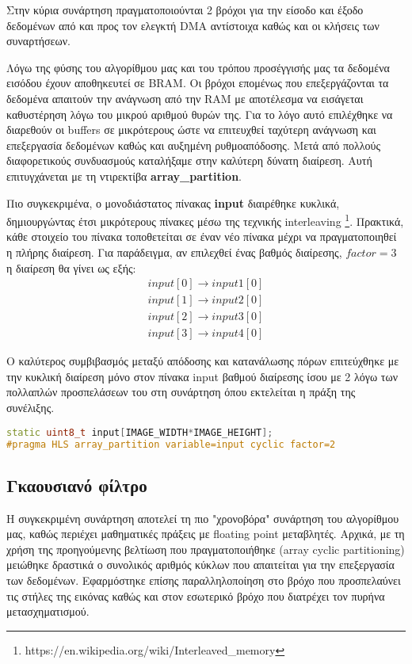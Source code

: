 Στην κύρια συνάρτηση πραγματοποιούνται 2 βρόχοι για την είσοδο και έξοδο δεδομένων από και προς τον ελεγκτή DΜΑ αντίστοιχα καθώς και οι κλήσεις των συναρτήσεων.

Λόγω της φύσης του αλγορίθμου μας και του τρόπου προσέγγισής μας τα δεδομένα εισόδου έχουν αποθηκευτεί σε BRAM. Οι βρόχοι επομένως που επεξεργάζονται τα δεδομένα απαιτούν την ανάγνωση από την RAM με αποτέλεσμα να εισάγεται καθυστέρηση λόγω του μικρού αριθμού θυρών της. Για το λόγο αυτό επιλέχθηκε να διαρεθούν οι buffers σε μικρότερους ώστε να επιτευχθεί ταχύτερη ανάγνωση και επεξεργασία δεδομένων καθώς και αυξημένη ρυθμοαπόδοσης. Μετά από πολλούς διαφορετικούς συνδυασμούς καταλήξαμε στην καλύτερη δύνατη διαίρεση. Αυτή επιτυγχάνεται με τη ντιρεκτίβα \textbf{array\_partition}.

Πιο συγκεκριμένα, ο μονοδιάστατος πίνακας \textbf{input} διαιρέθηκε κυκλικά, δημιουργώντας έτσι μικρότερους πίνακες μέσω της τεχνικής interleaving \footnote{https://en.wikipedia.org/wiki/Interleaved\_memory}. Πρακτικά, κάθε στοιχείο του πίνακα τοποθετείται σε έναν νέο πίνακα μέχρι να πραγματοποιηθεί η πλήρης διαίρεση. Για παράδειγμα, αν επιλεχθεί ένας βαθμός διαίρεσης, $factor =3$ η διαίρεση θα γίνει ως εξής:
\begin{align*}
input[0] \longrightarrow input1[0] \\
input[1] \longrightarrow input2[0] \\
input[2] \longrightarrow input3[0] \\
input[3] \longrightarrow input4[0]
\end{align*}

Ο καλύτερος συμβιβασμός μεταξύ απόδοσης και κατανάλωσης πόρων επιτεύχθηκε με την κυκλική διαίρεση μόνο στον πίνακα input βαθμού διαίρεσης ίσου με 2 λόγω των πολλαπλών προσπελάσεων του στη συνάρτηση όπου εκτελείται η πράξη της συνέλιξης.

\begin{lstlisting}[language=C++,belowskip=-0.3\baselineskip]
static uint8_t input[IMAGE_WIDTH*IMAGE_HEIGHT];
#pragma HLS array_partition variable=input cyclic factor=2
\end{lstlisting}

\subsection{Γκαουσιανό φίλτρο}

Η συγκεκριμένη συνάρτηση αποτελεί τη πιο "χρονοβόρα" συνάρτηση του αλγορίθμου μας, καθώς περιέχει μαθηματικές πράξεις με floating point μεταβλητές. Αρχικά, με τη χρήση της προηγούμενης βελτίωση που πραγματοποιήθηκε (array cyclic partitioning) μειώθηκε δραστικά ο συνολικός αριθμός κύκλων που απαιτείται για την επεξεργασία των δεδομένων. Εφαρμόστηκε επίσης παραλληλοποίηση στο βρόχο που προσπελαύνει τις στήλες της εικόνας καθώς και στον εσωτερικό βρόχο που διατρέχει τον πυρήνα μετασχηματισμού.

